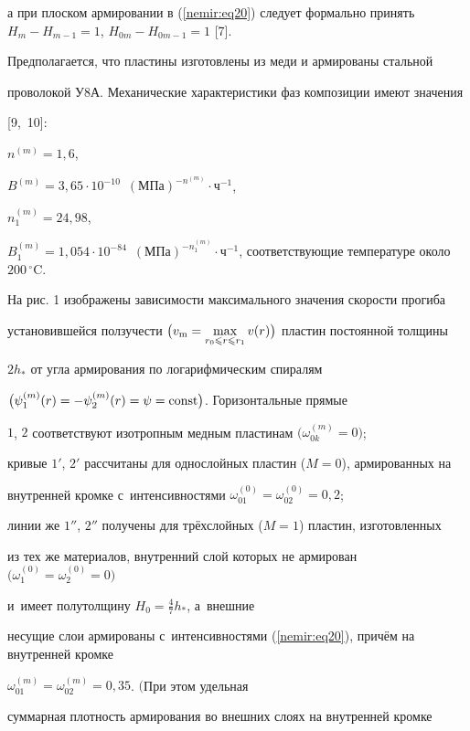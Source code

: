 а при плоском армировании в (\ref{nemir:eq20}) следует формально принять \mbox{$H_m {-} H_{m - 1} 

{=} 1$}, $H_{0m} - H_{0m - 1} = 1$ [7].



Предполагается, что пластины изготовлены из меди и армированы стальной 

проволокой У8А. Механические характеристики фаз композиции имеют значения 

[9,~10]: 

$n^{(m)} = 1,6$, 

$B^{(m)} = 3,65 \cdot 10^{ - 10}$~$(\text{МПа})^{ - n^{(m)}} \cdot \text{ч}^{ - 1}$, 

$n_1^{(m)} = 24,98$, 

$B_1^{(m)} = 1,054 \cdot 10^{ - 84}$~$( \text{МПа})^{- n_1^{(m)} } \cdot \text{ч}^{-1}$, соответствующие температуре около $200\,^\circ$C.



На рис. 1 изображены зависимости максимального значения скорости прогиба 

установившейся ползучести $\bigl(v_{\rm m} = \max \limits_{r_0 \leqslant r \leqslant r_1 } v(r)\bigr)$ пластин постоянной толщины 

$2h_ * $ от угла армирования по логарифмическим спиралям 

$\big(\psi _1^{(m)} (r) = {- \psi _2^{(m)} (r)} = \psi = {\rm const}\big)$. Горизонтальные прямые 

$1$, $2$ соответствуют изотропным медным пластинам $\bigl(\omega _{0k}^{(m)} = 0\bigr)$; 

кривые $1'$, $2'$ рассчитаны для однослойных пластин ($M = 0$), армированных на 

внутренней кромке с~интенсивностями $\omega _{01}^{(0)} = \omega _{02}^{(0)} = 0,2$; 

линии же $1''$, $2''$ получены для трёхслойных ($M = 1$) пластин, изготовленных 

из тех же материалов, внутренний слой которых не армирован $\bigl(\omega _1^{(0)} = \omega _2^{(0)} = 0\bigr)$ 

и~имеет полутолщину $H_0 = \frac47h_*$, а~внешние 

несущие слои армированы с~интенсивностями (\ref{nemir:eq20}), причём на внутренней кромке 

$\omega _{01}^{(m)} = \omega _{02}^{(m)} = 0,35$. $\big($При этом удельная 

суммарная плотность армирования во внешних слоях на внутренней кромке 

